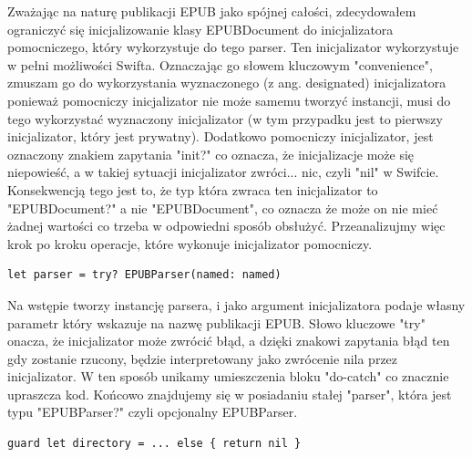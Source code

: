 Zważając na naturę publikacji EPUB jako spójnej całości, zdecydowałem ograniczyć się inicjalizowanie klasy EPUBDocument do inicjalizatora pomocniczego, który wykorzystuje do tego parser. Ten inicjalizator wykorzystuje w pełni możliwości Swifta. Oznaczając go słowem kluczowym "convenience", zmuszam go do wykorzystania wyznaczonego (z ang. designated) inicjalizatora ponieważ pomocniczy inicjalizator nie może samemu tworzyć instancji, musi do tego wykorzystać wyznaczony inicjalizator (w tym przypadku jest to pierwszy inicjalizator, który jest prywatny). Dodatkowo pomocniczy inicjalizator, jest oznaczony znakiem zapytania "init?" co oznacza, że inicjalizacje może się niepowieść, a w takiej sytuacji inicjalizator zwróci... nic, czyli "nil" w Swifcie. Konsekwencją tego jest to, że typ która zwraca ten inicjalizator to "EPUBDocument?" a nie "EPUBDocument", co oznacza że może on nie mieć żadnej wartości co trzeba w odpowiedni sposób obsłużyć. Przeanalizujmy więc krok po kroku operacje, które wykonuje inicjalizator pomocniczy.

\begin{lstlisting}[language=swift-reference]
    let parser = try? EPUBParser(named: named)
\end{lstlisting}

Na wstępie tworzy instancję parsera, i jako argument inicjalizatora podaje własny parametr który wskazuje na nazwę publikacji EPUB. Słowo kluczowe "try" onacza, że inicjalizator może zwrócić błąd, a dzięki znakowi zapytania błąd ten gdy zostanie rzucony, będzie interpretowany jako zwrócenie nila przez inicjalizator. W ten sposób unikamy umieszczenia bloku "do-catch" co znacznie upraszcza kod. Końcowo znajdujemy się w posiadaniu stałej "parser", która jest typu "EPUBParser?" czyli opcjonalny EPUBParser.

\begin{lstlisting}[language=swift-reference]
  guard let directory = ... else { return nil }
\end{lstlisting}

